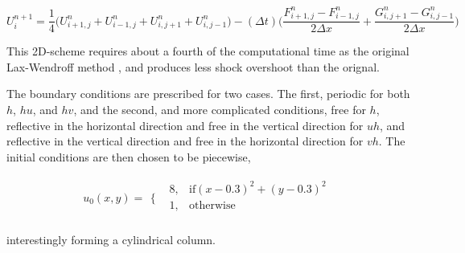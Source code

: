 \begin{dmath}\label{eqn:11}
U_{i}^{n+1} = \frac{1}{4} \Big( U_{i+1,j}^{n} + U_{i-1,j}^{n} + U_{i,j+1}^{n} + U_{i,j-1}^{n} \Big) 
- (\Delta t) \Big( \frac{ F_{i+1,j}^{n} - F_{i-1,j}^{n} }{2 \Delta x}  + \frac{ G_{i,j+1}^{n} - G_{i,j-1}^{n} }{ 2 \Delta x }  \Big)
\end{dmath} 

This 2D-scheme requires about a fourth of the computational time as the original Lax-Wendroff method \cite{Roach}, and produces less shock
 overshoot than the orignal. 
\newline

The boundary conditions are prescribed for two cases. The first, periodic for both $h$, $hu$, and $hv$, and the second,
 and more complicated conditions, free for $h$, reflective in the horizontal direction and free in the vertical direction 
for $uh$, and reflective in the vertical direction and free in the horizontal direction for $vh$. The initial conditions are then
 chosen to be piecewise, 

\begin{equation}\label{eqn:12}
u_0(x,y)=
\begin{array}{ll}
\Big\{ & 
\begin{array}{ll}
 8, & \text{if} (x-0.3)^2+(y-0.3)^2 \\
 1, & \text{otherwise} \\
\end{array}
\end{array}
\end{equation}

interestingly forming a cylindrical column.


